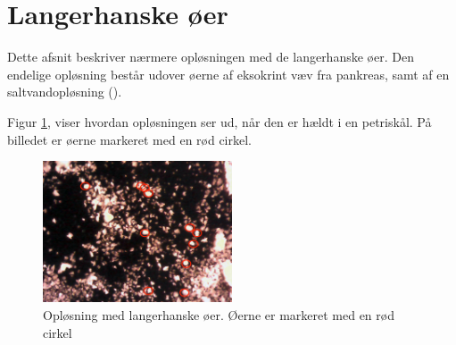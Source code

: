 %
%
%
%
%


\section{Langerhanske øer}
Dette afsnit beskriver nærmere opløsningen med de langerhanske øer. Den endelige opløsning består udover øerne af eksokrint væv fra pankreas, samt af en saltvandopløsning (\cite{hbbs}). 

Figur \ref{fig:islet}, viser hvordan opløsningen ser ud, når den er hældt i en petriskål. På billedet er øerne markeret med en rød cirkel.

\begin{figure}[H]
	\centering
	\includegraphics[width=0.5\textwidth]{billeder/software/sgbillede.png}
	\caption{Opløsning med langerhanske øer. Øerne er markeret med en rød cirkel}
	\label{fig:islet}
\end{figure}

